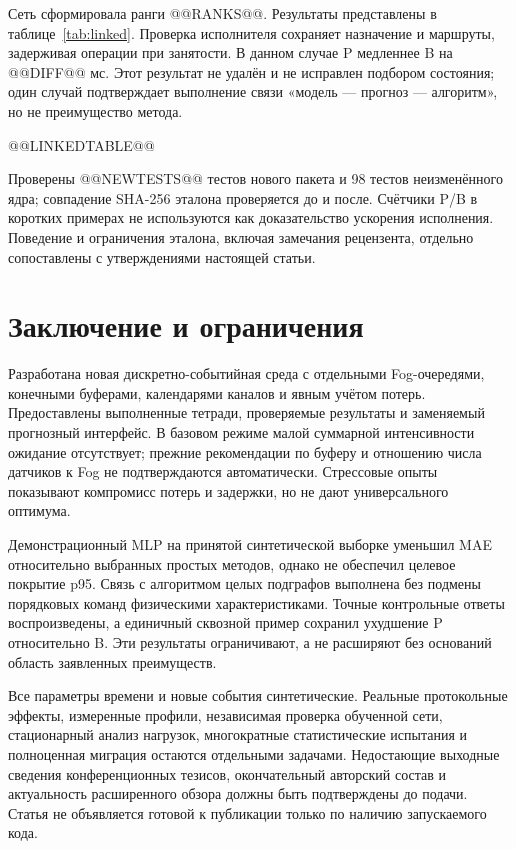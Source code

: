 \documentclass{psta}
\begin{document}
Сеть сформировала ранги @@RANKS@@. Результаты представлены в таблице~\ref{tab:linked}. Проверка исполнителя сохраняет назначение и маршруты, задерживая операции при занятости. В данном случае P медленнее B на @@DIFF@@ мс. Этот результат не удалён и не исправлен подбором состояния; один случай подтверждает выполнение связи «модель --- прогноз --- алгоритм», но не преимущество метода.

@@LINKEDTABLE@@

Проверены @@NEWTESTS@@ тестов нового пакета и 98 тестов неизменённого ядра; совпадение SHA-256 эталона проверяется до и после. Счётчики P/B в коротких примерах не используются как доказательство ускорения исполнения. Поведение и ограничения эталона, включая замечания рецензента, отдельно сопоставлены с утверждениями настоящей статьи.

\section{Заключение и ограничения}
Разработана новая дискретно-событийная среда с отдельными Fog-очередями, конечными буферами, календарями каналов и явным учётом потерь. Предоставлены выполненные тетради, проверяемые результаты и заменяемый прогнозный интерфейс. В базовом режиме малой суммарной интенсивности ожидание отсутствует; прежние рекомендации по буферу и отношению числа датчиков к Fog не подтверждаются автоматически. Стрессовые опыты показывают компромисс потерь и задержки, но не дают универсального оптимума.

Демонстрационный MLP на принятой синтетической выборке уменьшил MAE относительно выбранных простых методов, однако не обеспечил целевое покрытие p95. Связь с алгоритмом целых подграфов выполнена без подмены порядковых команд физическими характеристиками. Точные контрольные ответы воспроизведены, а единичный сквозной пример сохранил ухудшение P относительно B. Эти результаты ограничивают, а не расширяют без оснований область заявленных преимуществ.

Все параметры времени и новые события синтетические. Реальные протокольные эффекты, измеренные профили, независимая проверка обученной сети, стационарный анализ нагрузок, многократные статистические испытания и полноценная миграция остаются отдельными задачами. Недостающие выходные сведения конференционных тезисов, окончательный авторский состав и актуальность расширенного обзора должны быть подтверждены до подачи. Статья не объявляется готовой к публикации только по наличию запускаемого кода.

\raggedbottom


\English\maketitle
\end{document}
